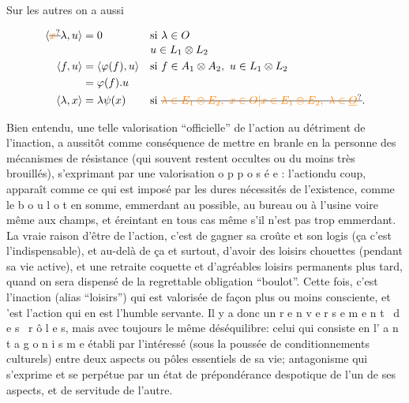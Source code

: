 \quad {}\quad{}

Sur les  autres on a aussi

\[
\begin{aligned}
 \langle\deleted{\unsure{x}}\lambda,u\rangle&=0 &&\text{si }\lambda\in O\\[-2pt]
 &&&u\in L_1\otimes L_2\\
 \langle f,u\rangle&=\langle\varphi(f),u\rangle &&\text{si } f\in A_1\otimes A_2,\ u\in L_1\otimes L_2\\
 &=\varphi(f).u\\
 \langle\lambda,x\rangle&=\lambda\psi(x) &&\text{si }\deleted{\unsure{\lambda\in E_1\otimes E_2,\ x\in O|x\in E_1\otimes E_2,\ \lambda\in\underline O}}.
\end{aligned}
\]


Bien entendu, une telle valorisation ``officielle'' de l'action au détriment de l'inaction, a aussitôt comme conséquence de mettre en branle en la personne des mécanismes de résistance (qui souvent restent occultes ou du moins très brouillés), s'exprimant par une valorisation o p p o s é e : l'action\handwritten{,}du coup, apparaît comme ce qui est imposé par les dures nécessités de l'existence, comme le b o u l o t en somme, emmerdant au possible, au bureau ou à l'usine voire même aux champs, et éreintant en tous cas même s'il n'est pas trop emmerdant. La vraie raison d'être de l'action, c'est de gagner sa croûte et son logis (ça c'est l'indispensable), et au-delà de ça et surtout, d'avoir des loisirs chouettes (pendant sa vie active), et une retraite coquette et d'agréables loisirs permanents plus tard, quand on sera dispensé de la regrettable obligation ``boulot''. Cette fois, c'est l'inaction (alias ``loisirs'') qui est valorisée de façon plus ou moins consciente, et 'est l'action qui en est l'humble servante. Il y a donc un r e n v e r s e m e n t \ d e s \ r ô l e s, mais avec toujours le même déséquilibre: celui qui consiste en l' a n t a g o n i s m e établi par l'intéressé (sous la poussée de conditionnements culturels) entre deux aspects ou pôles essentiels de sa vie; antagonisme qui s'exprime et se perpétue par un état de prépondérance despotique de l'un de ses aspects, et de servitude de l'autre.

